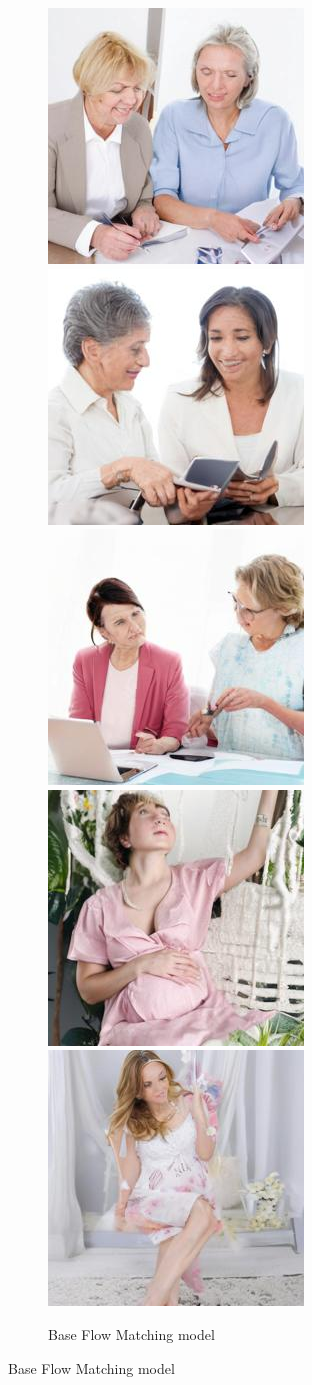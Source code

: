 \begin{figure}[h!]
\centering
    \begin{subfigure}[t]{0.32\linewidth}
    \centering
    \caption*{Base Flow Matching model}
    	\includegraphics[width=0.32\linewidth]{figs/samples_appendix_4/base_cfg_2_ode_prompt_12_image_0.jpg}\;%
    	\includegraphics[width=0.32\linewidth]{figs/samples_appendix_4/base_cfg_2_ode_prompt_12_image_1.jpg}\;%
    	\includegraphics[width=0.32\linewidth]{figs/samples_appendix_4/base_cfg_2_ode_prompt_12_image_2.jpg}\\ 
    	\includegraphics[width=0.32\linewidth]{figs/samples_appendix_4/base_cfg_2_ode_prompt_16_image_0.jpg}\;%
    	\includegraphics[width=0.32\linewidth]{figs/samples_appendix_4/base_cfg_2_ode_prompt_16_image_1.jpg}\;%

\end{subfigure}
\end{figure}
